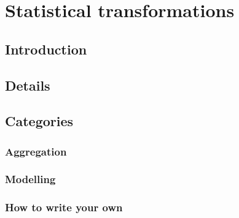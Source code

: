 

\chapter{Statistical transformations}

\section{Introduction}\label{sec:introduction}
\section{Details}\label{sec:details}
\section{Categories}\label{sec:categories}

\subsection{Aggregation}\label{sub:aggregation}
\subsection{Modelling}\label{sub:modelling}

\subsection{How to write your own}\label{sub:how_to_write_your_own} 


